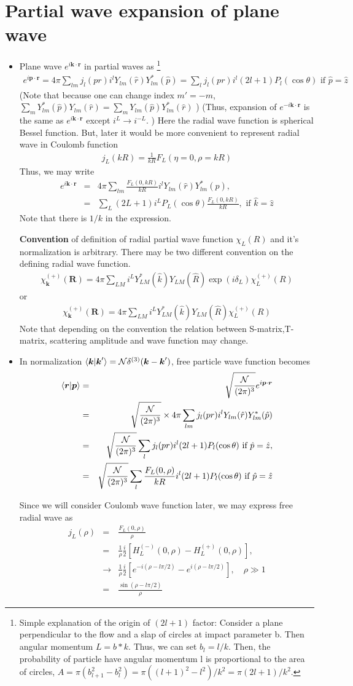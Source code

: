 \documentclass[10pt]{book}
\def\bm{\boldsymbol}
\newcommand{\bea}{\begin{eqnarray}}
\newcommand{\eea}{\end{eqnarray}}
\newcommand{\no}{\nonumber \\}
\def\vp{{\bm p}}
\def\vk{{\bm k}}
\def\vr{{\bm r}}
\def\vR{{\bm R}}
\def\la{\langle}
\def\ra{\rangle}
\begin{document}
\section{Partial wave expansion of plane wave}
\begin{itemize}
\item 
Plane wave $e^{i\vk\cdot\vr}$ in partial waves as
\footnote{Simple explanation of the origin of $(2l+1)$ factor:
Consider a plane perpendicular to the flow and a slap of circles
at impact parameter b. Then angular momentum $L=b*k$. Thus, we can
set $b_l=l/k$. 
Then, the probability of particle have angular momentum l
is proportional to the area of circles,
$A=\pi(b_{l+1}^2-b_l^2)=\pi((l+1)^2-l^2)/k^2 =\pi(2l+1)/k^2 $. 
}
\bea
\boxed{e^{i\vp\cdot\vr}
=4\pi \sum_{lm} j_l(pr) i^l Y_{lm}(\hat{r})Y^*_{lm}(\hat{p})
=\sum_l j_l(pr)i^l (2l+1) P_l(\cos\theta)
\mbox{ if } \hat{p}=\hat{z} }
\eea
(Note that because one can change index $m'=-m$,
$\sum_m Y^*_{lm}(\hat{p}) Y_{lm}(\hat{r})=\sum_m Y_{lm}(\hat{p}) Y^*_{lm}(\hat{r})$
)
(Thus, expansion of $e^{-i\vk\cdot\vr}$ is the same as $e^{i\vk\cdot\vr}$
except $i^L \to i^{-L}$. )
Here the radial wave function is spherical Bessel function. 
But, later it would be more convenient to represent 
radial wave in Coulomb function
\bea 
j_L(kR)=\frac{1}{kR}F_L(\eta=0,\rho=kR)
\eea 
Thus, we may write 
\bea 
e^{i\vk\cdot\vr}
&=&4\pi \sum_{lm} \frac{F_L(0,kR)}{kR} i^l Y_{lm}(\hat{r})Y^*_{lm}(\hat{p}),\no 
&=& \sum_{L} (2L+1) i^L P_L(\cos\theta)\frac{F_L(0,kR)}{kR}, 
    \mbox{ if } \hat{k}=\hat{z} 
\eea 
Note that there is $1/k$ in the expression. 

{\bf Convention} of definition of radial partial wave function $\chi_L(R)$ 
and it's normalization is arbitrary. 
There may be two different convention on the defining radial wave function. 
\bea 
\chi^{(+)}_{\vk}(\vR)=4\pi \sum_{LM} i^L Y^*_{LM}(\hat{k})Y_{LM}(\hat{R}) \exp(i\delta_L) \chi^{(+)}_{L}(R)
\eea  
or 
\bea 
\chi^{(+)}_{\vk}(\vR)=4\pi \sum_{LM} i^L Y^*_{LM}(\hat{k})Y_{LM}(\hat{R}) \chi^{(+)}_{L}(R)
\eea  
Note that depending on the convention the relation 
between S-matrix,T-matrix, scattering amplitude and wave function may change. 

\item In normalization $\la \vk|\vk'\ra={\cal N}\delta^{(3)}(\vk-\vk') $,
free particle wave function becomes
\bea
\la \vr|\vp\ra&=&\sqrt{\frac{\cal N}{(2\pi)^3}} e^{i\vp\cdot\vr} \no 
&=& \sqrt{\frac{\cal N}{(2\pi)^3}}\times  4\pi \sum_{lm} 
             j_l(pr) i^l Y_{lm}(\hat{r})Y^*_{lm}(\hat{p}) \no
&=& \sqrt{\frac{\cal N}{(2\pi)^3}}\sum_{l}j_l(pr) i^l(2l+1) P_{l}(\cos\theta) 
\mbox{ if $\hat{p}=\hat{z}$},\no 
&=& \sqrt{\frac{\cal N}{(2\pi)^3}}\sum_{l}\frac{F_L(0,\rho)}{kR}
  i^l(2l+1) P_{l}(\cos\theta) 
\mbox{ if $\hat{p}=\hat{z}$}
\eea

Since we will consider Coulomb wave function later, we may express free radial wave as
\bea 
j_L(\rho)&=&\frac{F_L(0,\rho)}{\rho} \no 
   &=&\frac{1}{\rho}\frac{i}{2}[H_L^{(-)}(0,\rho)-H_L^{(+)}(0,\rho)],\no 
   &\to& \frac{1}{\rho}\frac{i}{2}[ e^{-i(\rho-l\pi/2)}-e^{i(\rho-l\pi/2)}],\quad \rho\gg 1 \no 
   &=& \frac{\sin(\rho-l\pi/2)}{\rho}
\eea 
\end{itemize} 
\end{document}
